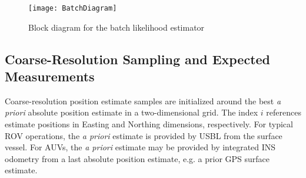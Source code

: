 \begin{figure}[!h]
	\centering
         \texttt{[image: BatchDiagram]}
         \caption{Block diagram for the batch likelihood estimator}
	\label{fig:batchDiagram}
\end{figure}


%
%
%

\subsection{Coarse-Resolution Sampling and Expected Measurements}
\label{framework.Motionless.Coarse}

Coarse-resolution position estimate samples are initialized around the best \emph{a priori} absolute position estimate in a two-dimensional grid.
The index $i$ references estimate positions in Easting and Northing dimensions, respectively.  
For typical ROV operations, the \emph{a priori} estimate is provided by USBL from the surface vessel.
For AUVs, the \emph{a priori} estimate may be provided by integrated INS odometry from a last absolute position estimate, e.g. a prior GPS surface estimate.

